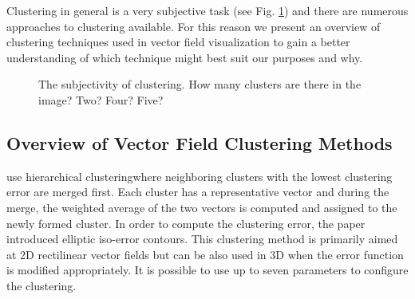 Clustering in general is a very subjective task (see Fig. \ref{fig:illustration-clustering_subjectivity}) and there are numerous approaches to clustering available. For this reason we present an overview of clustering techniques used in vector field visualization to gain a better understanding of which technique might best suit our purposes and why.

\begin{figure}[h]
	\centering
	\def\svgwidth{0.6\textwidth}
	
	\caption[The subjectivity of clustering]{The subjectivity of clustering. How many clusters are there in the image? Two? Four? Five?}
	\label{fig:illustration-clustering_subjectivity}
\end{figure}

\subsection{Overview of Vector Field Clustering Methods}
\label{subsec:analysis-field_clustering-overview}

\citet{Telea99} use hierarchical clustering\footnotemark where neighboring clusters with the lowest clustering error are merged first. Each cluster has a representative vector and during the merge, the weighted average of the two vectors is computed and assigned to the newly formed cluster. In order to compute the clustering error, the paper introduced elliptic iso-error contours\footnotemark. This clustering method is primarily aimed at 2D rectilinear vector fields but can be also used in 3D when the error function is modified appropriately. It is possible to use up to seven parameters to configure the clustering.

\addtocounter{footnote}{-2}

